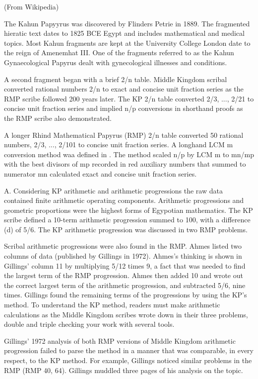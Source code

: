 \documentclass[12pt]{article}
\begin{document}
 (From Wikipedia)

The Kahun Papyyrus was discovered by Flinders Petrie in 1889. The fragmented hieratic text dates to 1825 BCE Egypt and includes mathematical and medical topics. Most Kahun fragments are kept at the University College London date to the reign of Amenemhat III. One of the fragments referred to as the Kahun Gynaecological Papyrus dealt with gynecological illnesses and conditions.

A second fragment began with a brief 2/n table. Middle Kingdom scribal converted rational numbers 2/n to exact and concise unit fraction series as the RMP scribe followed 200 years later. The KP 2/n table converted 2/3, ..., 2/21 to concise unit fraction series and implied n/p conversions in shorthand proofs as the RMP scribe also demonstrated. 

A longer Rhind Mathematical Papyrus (RMP) 2/n table converted 50 rational numbers, 2/3, ..., 2/101 to concise unit fraction series. A longhand LCM m conversion method waa defined in . The method scaled n/p by LCM m to mn/mp with the best divisors of mp recorded in red auxiliary numbers that summed to numerator mn calculated exact and concise unit fraction series. 

A. Considering KP arithmetic and arithmetic progressions the raw data contained finite arithmetic operating components. Arithmetic progressions and geometric proportions were the highest forms of Egypotian mathematics. The KP scribe defined a 10-term arithmetic progression summed to 100, with a difference (d) of 5/6. The KP arithmetic progression was discussed in two RMP problems.

Scribal arithmetic progressions were also found in the RMP. Ahmes listed two columns of data (published by Gillings in 1972). Ahmes's thinking is shown in Gillings' column 11 by multiplying 5/12 times 9, a fact that was needed to find the largest term of the RMP progression. Ahmes then added 10 and wrote out the correct largest term of the arithmetic progression, and subtracted 5/6, nine times. Gillings found the remaining terms of the progressions by using the KP's method. To understand the KP method, readers must make arithmetic calculations as the Middle Kingdom scribes wrote down in their three problems, double and triple checking your work with several tools.

Gillings' 1972 analysis of both RMP versions of Middle Kingdom arithmetic progression failed to parse the method in a manner that was comparable, in every respect, to the KP method. For example, Gillings noticed similar problems in the RMP (RMP 40, 64). Gillings muddled three pages of his analysis on the topic.
\end{document}
